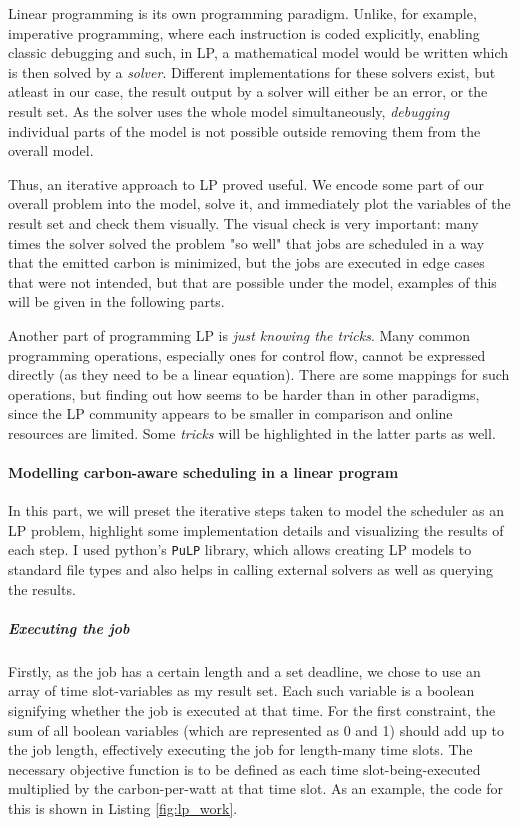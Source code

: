Linear programming is its own programming paradigm. Unlike, for example, imperative programming, where each instruction is coded explicitly, enabling classic debugging and such, in LP, a mathematical model would be written which is then solved by a \emph{solver}. 
Different implementations for these solvers exist, but atleast in our case, the result output by a solver will either be an error, or the result set. 
As the solver uses the whole model simultaneously, \emph{debugging} individual parts of the model is not possible outside removing them from the overall model.

Thus, an iterative approach to LP proved useful. 
We encode some part of our overall problem into the model, solve it, and immediately plot the variables of the result set and check them visually.
The visual check is very important: many times the solver solved the problem "so well" that jobs are scheduled in a way that the emitted carbon is minimized, but the jobs are executed in edge cases that were not intended, but that are possible under the model, examples of this will be given in the following parts.

Another part of programming LP is \emph{just knowing the tricks}. 
Many common programming operations, especially ones for control flow, cannot be expressed directly (as they need to be a linear equation).
There are some mappings for such operations, but finding out how seems to be harder than in other paradigms, since the LP community appears to be smaller in comparison and online resources are limited.
Some \emph{tricks} will be highlighted in the latter parts as well. 

\paragraph{Modelling carbon-aware scheduling in a linear program}

In this part, we will preset the iterative steps taken to model the scheduler as an LP problem, highlight some implementation details and visualizing the results of each step.
I used python's \verb|PuLP| library, which allows creating LP models to standard file types and also helps in calling external solvers as well as querying the results.

\subparagraph{Executing the job}

Firstly, as the job has a certain length and a set deadline, we chose to use an array of time slot-variables as my result set. Each such variable is a boolean signifying whether the job is executed at that time.
For the first constraint, the sum of all boolean variables (which are represented as 0 and 1) should add up to the job length, effectively executing the job for length-many time slots.
The necessary objective function is to be defined as each time slot-being-executed multiplied by the carbon-per-watt at that time slot.
As an example, the code for this is shown in Listing \ref{fig:lp_work}.


